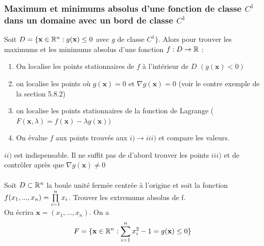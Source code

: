\documentclass[12pt,a4paper]{article}
\begin{document}
\subsubsection{Maximum et minimums absolus d'une fonction de classe $C^1$ dans un domaine avec un bord de classe $C^1$}
Soit $D = \{ \textbf{x} \in \rn : g(\textbf{x}) \leq 0$ avec $g$ de classe $C^1\}$. Alors pour trouver les maximums et les minimums absolus d'une fonction $f : D \to \R$ :
\begin{enumerate}[label=\roman*)]
	\item 	On localise les points stationnaires de $f$ à l'intérieur de $D$ $(g(\textbf{x}) < 0)$
	\item 	on localise les points où $g(\textbf{x}) = 0$ et $\nabla g(\textbf{x}) = 0$ (voir le contre exemple de la section 5.8.2)
	\item 	on localise les points stationnaires de la fonction de Lagrange \big($F(\textbf{x},\lambda) = f(\textbf{x}) - \lambda g(\textbf{x})\big)$
	\item 	On évalue $f$ aux points trouvés aux $i) \to iii)$ et compare les valeurs.
\end{enumerate}
 $ii)$ est indispensable. Il ne suffit pas de d'abord trouver les points $iii)$ et de contrôler après que $\nabla g(\textbf{x}) \neq 0$\\
\\
Soit $D \subset \rn$ la boule unité fermée centrée à l'origine et soit la fonction $f(x_1,...,x_n) = \produit{n}{i=1} x_i$. Trouver les extremums absolus de f.\\
On écrira $\textbf{x} = (x_1,...,x_n)$. On a 
\begin{equation*}
	F = \{\textbf{x}\in \rn : \somme{n}{i=1}x_i^2 - 1 = g(\textbf{x}) \leq 0\}
\end{equation*}
\end{document}
